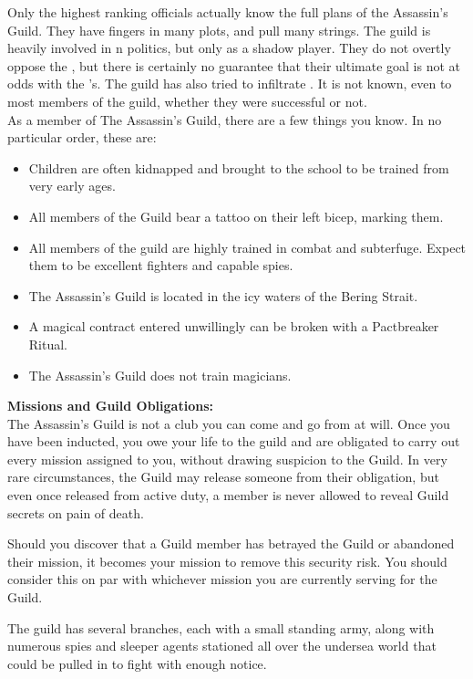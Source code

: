 \documentclass[blue]{NeptuneBall}
\begin{document}
\name{\bAssassin{}}

Only the highest ranking officials actually know the full plans of the Assassin's Guild. They have fingers in many plots, and pull many strings. The guild is heavily involved in \pPacifica{}n politics, but only as a shadow player.  They do not overtly oppose the \cPacificanRuler{\King}, but there is certainly no guarantee that their ultimate goal is not at odds with the \cPacificanRuler{\King}'s. The guild has also tried to infiltrate \pAtlantis{}. It is not known, even to most members of the guild, whether they were successful or not.\\

As a member of The Assassin's Guild, there are a few things you know. In no particular order, these are:

\begin{itemize}
  \item Children are often kidnapped and brought to the school to be trained from very early ages.
  \item All members of the Guild bear a tattoo on their left bicep, marking them.
  \item All members of the guild are highly trained in combat and subterfuge. Expect them to be excellent fighters and capable spies.
  \item The Assassin's Guild is located in the icy waters of the Bering Strait.
	\item A magical contract entered unwillingly can be broken with a Pactbreaker Ritual.
  \item The Assassin's Guild does not train magicians.\\
\end{itemize}

{\bf Missions and Guild Obligations:}\\
The Assassin's Guild is not a club you can come and go from at will. Once you have been inducted, you owe your life to the guild and are obligated to carry out every mission assigned to you, without drawing suspicion to the Guild. In very rare circumstances, the Guild may release someone from their obligation, but even once released from active duty, a member is never allowed to reveal Guild secrets on pain of death.

Should you discover that a Guild member has betrayed the Guild or abandoned their mission, it becomes your mission to remove this security risk. You should consider this on par with whichever mission you are currently serving for the Guild.

\begin{itemz}[Trivia]
	\item The guild has several branches, each with a small standing army, along with numerous spies and sleeper agents stationed all over the undersea world that could be pulled in to fight with enough notice.
\end{itemz}
\end{document}
